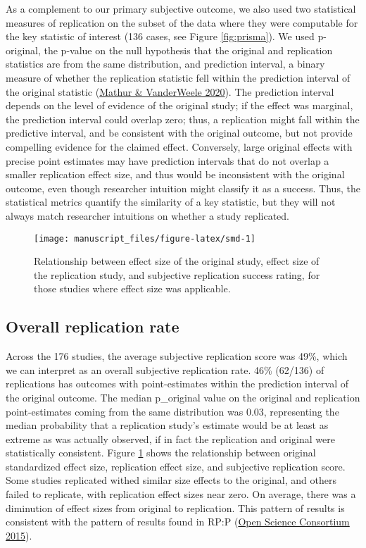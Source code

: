 \documentclass[
  english,
  a4paper,
]{article}
\begin{document}
As a complement to our primary subjective outcome, we also used two statistical measures of replication on the subset of the data where they were computable for the key statistic of interest (136 cases, see Figure \ref{fig:prisma}). We used p-original, the p-value on the null hypothesis that the original and replication statistics are from the same distribution, and prediction interval, a binary measure of whether the replication statistic fell within the prediction interval of the original statistic (\protect\hyperlink{ref-mathur2020}{Mathur \& VanderWeele 2020}). The prediction interval depends on the level of evidence of the original study; if the effect was marginal, the prediction interval could overlap zero; thus, a replication might fall within the predictive interval, and be consistent with the original outcome, but not provide compelling evidence for the claimed effect. Conversely, large original effects with precise point estimates may have prediction intervals that do not overlap a smaller replication effect size, and thus would be inconsistent with the original outcome, even though researcher intuition might classify it as a success. Thus, the statistical metrics quantify the similarity of a key statistic, but they will not always match researcher intuitions on whether a study replicated.

\begin{figure}[ht]
\texttt{[image: manuscript\_files/figure-latex/smd-1]} \caption{Relationship between effect size of the original study, effect size of the replication study, and subjective replication success rating, for those studies where effect size was applicable.}\label{fig:smd}
\end{figure}

\hypertarget{overall-replication-rate}{%
\subsection{Overall replication rate}\label{overall-replication-rate}}

Across the 176 studies, the average subjective replication score was 49\%, which we can interpret as an overall subjective replication rate. 46\% (62/136) of replications has outcomes with point-estimates within the prediction interval of the original outcome. The median p\_original value on the original and replication point-estimates coming from the same distribution was 0.03, representing the median probability that a replication study's estimate would be at least as extreme as was actually observed, if in fact the replication and original were statistically consistent. Figure \ref{fig:smd} shows the relationship between original standardized effect size, replication effect size, and subjective replication score. Some studies replicated withed similar size effects to the original, and others failed to replicate, with replication effect sizes near zero. On average, there was a diminution of effect sizes from original to replication. This pattern of results is consistent with the pattern of results found in RP:P (\protect\hyperlink{ref-openscienceconsortium2015}{Open Science Consortium 2015}).
\end{document}
